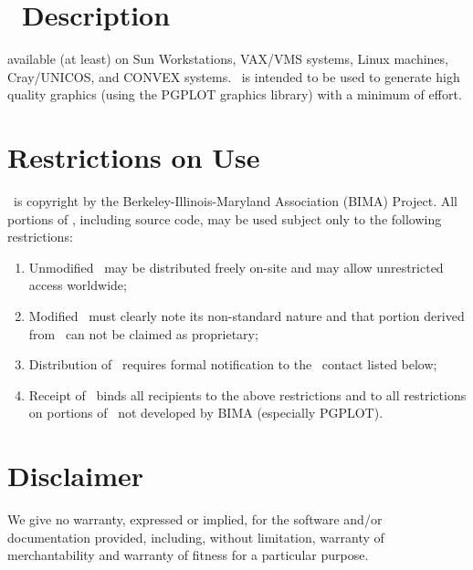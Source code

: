 %
\section*{\wip\ Description}

available (at least) on Sun Workstations,
VAX/VMS systems, Linux machines, Cray/UNICOS, and CONVEX systems.
\wip\ is intended to be used to generate high quality graphics
(using the PGPLOT graphics library) with a minimum of effort.

\section*{Restrictions on Use}

\wip\ is copyright by the Berkeley-Illinois-Maryland Association (BIMA) Project.
All portions of \wip, including source code, may be used
subject only to the following restrictions:
\begin{enumerate}
  \item Unmodified \wip\ may be distributed freely on-site and
        may allow unrestricted access worldwide;
  \item Modified \wip\ must clearly note its non-standard nature and that
        portion derived from \wip\ can not be claimed as proprietary;
  \item Distribution of \wip\ requires formal notification to the
        \wip\ contact listed below;
  \item Receipt of \wip\ binds all recipients
        to the above restrictions and to all restrictions on portions of
        \wip\ not developed by BIMA (especially PGPLOT).
\end{enumerate}

\section*{Disclaimer}

We give no warranty, expressed or implied, for the software and/or
documentation provided, including, without limitation, warranty
of merchantability and warranty of fitness for a particular purpose.

